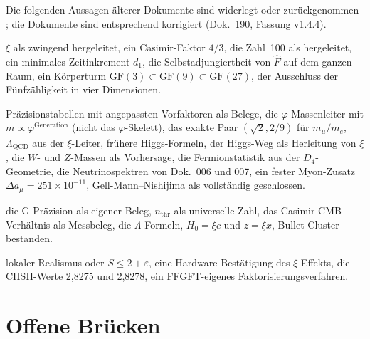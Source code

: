 Die folgenden Aussagen älterer Dokumente sind widerlegt oder zurückgenommen \XM; die
Dokumente sind entsprechend korrigiert (Dok.~190, Fassung v1.4.4).
\begin{description}[leftmargin=0pt,itemsep=3pt,font=\normalfont\bfseries]
\item[Grundlagen:] $\xi$ als zwingend hergeleitet,
ein Casimir-Faktor $4/3$, die Zahl~100 als hergeleitet, ein minimales
Zeitinkrement $d_1$, die Selbstadjungiertheit von $\hat F$ auf dem ganzen Raum, ein Körperturm
$\mathrm{GF}(3)\subset\mathrm{GF}(9)\subset\mathrm{GF}(27)$, der Ausschluss der Fünfzähligkeit in vier Dimensionen.
\item[Teilchen:] Präzisionstabellen mit angepassten Vorfaktoren als Belege, die
$\varphi$-Massenleiter mit $m\propto\varphi^{\text{Generation}}$ (nicht das $\varphi$-Skelett), das exakte Paar $(\sqrt2,2/9)$ für $m_\mu/m_e$, $\Lambda_{\text{QCD}}$ aus
der $\xi$-Leiter, frühere Higgs-Formeln, der Higgs-Weg als Herleitung von $\xi$, die $W$- und $Z$-Massen als Vorhersage, die Fermionstatistik aus der $D_4$-Geometrie, die Neutrinospektren von Dok.~006 und 007, ein fester
Myon-Zusatz $\Delta a_\mu=251\times10^{-11}$, Gell-Mann--Nishijima als vollständig geschlossen.
\item[Gravitation und Kosmos:] die G-Präzision als eigener Beleg, $n_{\text{thr}}$ als universelle Zahl,
das Casimir-CMB-Verhältnis als Messbeleg, die $\Lambda$-Formeln, $H_0=\xi c$ und $z=\xi x$,
\glqq Bullet Cluster bestanden\grqq.
\item[Quantenmechanik:] lokaler Realismus oder
$S\le2+\varepsilon$, eine Hardware-Bestätigung des $\xi$-Effekts, die CHSH-Werte 2,8275 und
2,8278, ein FFGFT-eigenes Faktorisierungsverfahren.
\end{description}

\section{Offene Brücken}

